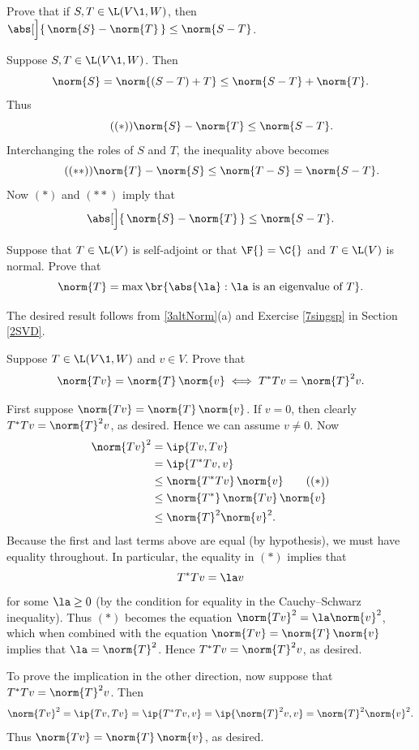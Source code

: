 
\exercise
Prove that if $S, T \in \L(V\1, W)$, then $\abs[\Big]{\, \norm{S} - \norm{T} \,} \le \norm{S-T}$. \label{5reverse}

\begin{Solution}
Suppose $S, T \in \L(V\1, W)$. Then
\[
\norm{S} = \norm{(S-T) + T} \le \norm{S-T} + \norm{T}.
\]
Thus
\[ \tag{$(*)$}
\norm{S} - \norm{T} \le \norm{S-T}.
\]
Interchanging the roles of $S$ and $T$, the inequality above becomes
\[ \tag{$(**)$}
\norm{T} - \norm{S} \le \norm{T-S} = \norm{S-T}.
\]
Now $(*)$ and $(**)$ imply that
\[
\abs[\Big]{\, \norm{S} - \norm{T} \,} \le \norm{S-T}.
\]
\end{Solution}

\exercise
Suppose that $T \in \L(V)$ is self-adjoint or that $\F{}= \C{}$ and $T \in \L(V)$ is normal. Prove that
\[
\norm{T} = \max \br{ \abs{\la} : \la \text{ is an eigenvalue of } T}.
\]
\exercisedisplayend

\begin{Solution}
The desired result follows from \ref{3altNorm}(a) and Exercise \ref{7singsp} in Section \ref{2SVD}.
\end{Solution}

\exercise
Suppose $T \in \L(V\1, W)$ and $v \in V$. Prove that\label{7eq}
\[
\norm{Tv} = \norm{T} \, \norm{v} \iff T^*T v = \norm{T}^2 v.
\]
\exercisedisplayend

\begin{Solution}
First suppose $\norm{Tv} = \norm{T} \, \norm{v}$. If $v = 0$, then clearly $T^*T v = \norm{T}^2 v$, as desired. Hence we can assume
$v \ne 0$. Now
\begin{align*}
\norm{Tv}^2 &= \ip{Tv, Tv} \\
&= \ip{ T^* T v, v} \\
&\le \norm{T^*Tv} \, \norm{v} \tag{$(*)$} \\
&\le \norm{T^*} \, \norm{Tv} \, \norm{v}\\
&\le \norm{T}^2 \norm{v}^2.
\end{align*}
Because the first and last terms above are equal (by hypothesis), we must have equality throughout. In particular, the equality in $(*)$ implies that
\[
T^* T v = \la v
\]
for some $\la \ge 0$ (by the condition for equality in the Cauchy--Schwarz inequality). Thus $(*)$ becomes the equation $\norm{Tv}^2 = \la \norm{v}^2$, which when combined with the equation $\norm{Tv} = \norm{T} \, \norm{v}$ implies that $\la = \norm{T}^2$. Hence
$T^*T v = \norm{T}^2 v$, as desired.

To prove the implication in the other direction, now suppose that $T^*T v = \norm{T}^2 v$. Then
\[
\norm{Tv}^2 = \ip{Tv, Tv} = \ip{T^* Tv, v} = \ip{\norm{T}^2 v, v} = \norm{T}^2 \norm{v}^2.
\]
Thus $\norm{Tv} = \norm{T} \, \norm{v}$, as desired.
\end{Solution}

